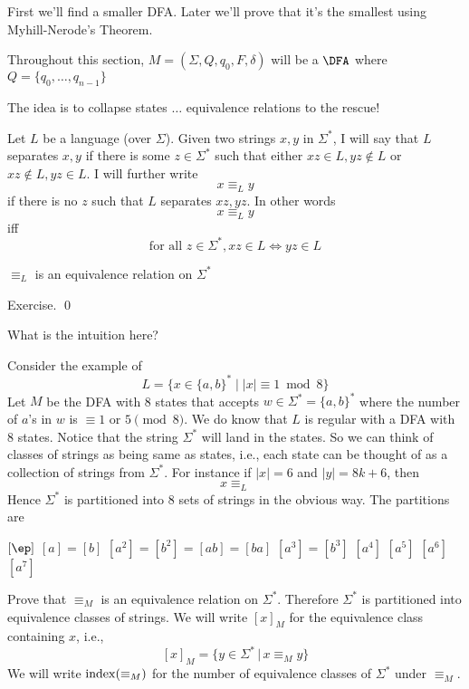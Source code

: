 First we'll find a smaller DFA. Later we'll prove that it's the
smallest using Myhill-Nerode's Theorem.

Throughout this section, $M = (\Sigma,Q,q_0,F,\delta)$ will be a $\DFA$
where $Q = \{q_0,\ldots,q_{n-1}\}$

The idea is to collapse states $\ldots$ equivalence relations to
the rescue!


Let $L$ be a language (over $\Sigma$).
Given two strings $x,y$ in $\Sigma^*$, I will say
that $L$ separates $x,y$ if
there is some $z \in \Sigma^*$ such that 
either
$xz \in L, yz \not\in L$
or 
$xz \not\in L, yz \in L$.
I will further write
\[
x \equiv_L y
\]
if there is no $z$ such that $L$ separates $xz,yz$.
In other words
\[
x \equiv_L y
\]
iff
\[
\text{for all } z \in \Sigma^*, xz \in L \iff yz \in L
\]


\begin{prop}
$\equiv_L$ is an equivalence relation on $\Sigma^*$
\end{prop}
\proof
Exercise.
\qed


What is the intuition here?


Consider the example of
\[
L = \{ x \in \{a,b\}^* \mid |x| \equiv 1 \bmod{8}\}
\]
Let $M$ be the DFA with 8 states that accepts
$w \in \Sigma^* = \{a, b\}^*$ where the number of
$a$'s in $w$ is $\equiv 1$ or $5 \pmod{8}$.
We do know that $L$ is regular with a DFA with 8 states.
Notice that the string $\Sigma^*$ will land in the states.
So we can think of classes of strings as being same as states, i.e.,
each state can be thought of as a collection of strings from $\Sigma^*$.
For instance if $|x| = 6$ and $|y| = 8k + 6$, then
\[
x \equiv_L
\]
Hence $\Sigma^*$ is partitioned into 8 sets of strings in the obvious way.
The partitions are
\begin{tightlist}
  \li $[\ep]$
  \li $[a] = [b]$
  \li $[a^2] = [b^2] = [ab] = [ba]$
  \li $[a^3] = [b^3]$
  \li $[a^4]$
  \li $[a^5]$
  \li $[a^6]$
  \li $[a^7]$
\end{tightlist}

\newpage
\begin{ex}
Prove that $\equiv_M$ is an equivalence relation on $\Sigma^*$.
Therefore $\Sigma^*$ is partitioned into equivalence classes of
strings. We will write $[x]_M$ for the equivalence class containing
$x$, i.e.,
\[
 [x]_M = \{ y \in \Sigma^* \,|\, x \equiv_M y \}
\]
We will write $\operatorname{index}(\equiv_M)$ for the number of equivalence classes
of $\Sigma^*$ under $\equiv_M$.
\end{ex}


